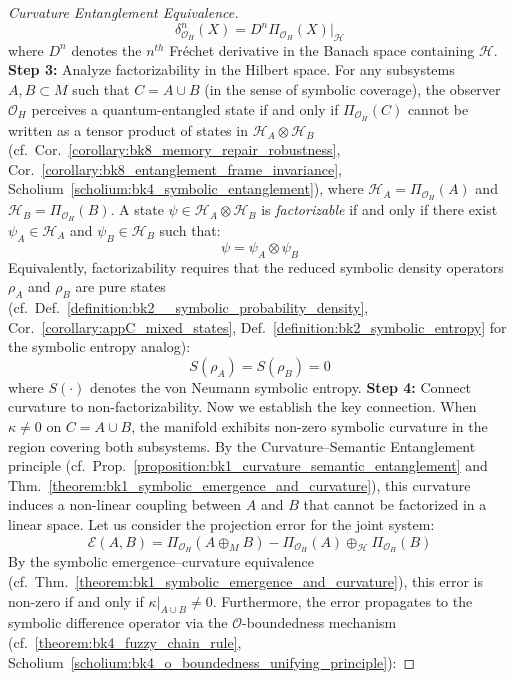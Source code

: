 \begin{proof}[Curvature Entanglement Equivalence]
\begin{equation}
\delta^n_{\mathcal{O}_H}(X) = D^n\Pi_{\mathcal{O}_H}(X)|_{\mathcal{H}}
\end{equation}
where $D^n$ denotes the $n^{th}$ Fréchet derivative in the Banach space containing $\mathcal{H}$.
\textbf{Step 3:} Analyze factorizability in the Hilbert space.
For any subsystems $A, B \subset M$ such that $C = A \cup B$ (in the sense of symbolic coverage), the observer $\mathcal{O}_H$ perceives a quantum-entangled state if and only if $\Pi_{\mathcal{O}_H}(C)$ cannot be written as a tensor product of states in $\mathcal{H}_A \otimes \mathcal{H}_B$ (cf.~Cor.~\ref{corollary:bk8_memory_repair_robustness}, Cor.~\ref{corollary:bk8_entanglement_frame_invariance}, Scholium~\ref{scholium:bk4_symbolic_entanglement}), where $\mathcal{H}_A = \Pi_{\mathcal{O}_H}(A)$ and $\mathcal{H}_B = \Pi_{\mathcal{O}_H}(B)$.
A state $\psi \in \mathcal{H}_A \otimes \mathcal{H}_B$ is \emph{factorizable} if and only if there exist $\psi_A \in \mathcal{H}_A$ and $\psi_B \in \mathcal{H}_B$ such that:
\begin{equation}
\psi = \psi_A \otimes \psi_B
\end{equation}
Equivalently, factorizability requires that the reduced symbolic density operators $\rho_A$ and $\rho_B$ are pure states (cf.~Def.~\ref{definition:bk2__symbolic_probability_density}, Cor.~\ref{corollary:appC_mixed_states}, Def.~\ref{definition:bk2_symbolic_entropy} for the symbolic entropy analog):
\begin{equation}
S(\rho_A) = S(\rho_B) = 0
\end{equation}
where $S(\cdot)$ denotes the von Neumann symbolic entropy.
\textbf{Step 4:} Connect curvature to non-factorizability.
Now we establish the key connection. When $\kappa \neq 0$ on $C = A \cup B$, the manifold exhibits non-zero symbolic curvature in the region covering both subsystems. By the Curvature--Semantic Entanglement principle (cf.~Prop.~\ref{proposition:bk1_curvature_semantic_entanglement} and Thm.~\ref{theorem:bk1_symbolic_emergence_and_curvature}), this curvature induces a non-linear coupling between $A$ and $B$ that cannot be factorized in a linear space.
Let us consider the projection error for the joint system:
\begin{equation}
\mathcal{E}(A,B) = \Pi_{\mathcal{O}_H}(A \oplus_M B) - \Pi_{\mathcal{O}_H}(A) \oplus_{\mathcal{H}} \Pi_{\mathcal{O}_H}(B)
\end{equation}
By the symbolic emergence--curvature equivalence (cf.~Thm.~\ref{theorem:bk1_symbolic_emergence_and_curvature}), this error is non-zero if and only if $\kappa|_{A \cup B} \neq 0$. Furthermore, the error propagates to the symbolic difference operator via the $\mathcal{O}$-boundedness mechanism (cf.~\ref{theorem:bk4_fuzzy_chain_rule}, Scholium~\ref{scholium:bk4_o_boundedness_unifying_principle}):

\end{proof}
